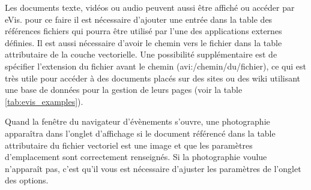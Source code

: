 \label{evis_location}

Les documents texte, vidéos ou audio peuvent aussi être affiché ou accéder par eVis. pour ce faire il est nécessaire d'ajouter une entrée dans la table des références fichiers qui pourra être utilisé par l'une des applications externes définies. Il est aussi nécessaire d'avoir le chemin vers le fichier dans la table attributaire de la couche vectorielle. Une possibilité supplémentaire est de spécifier l'extension du fichier avant le chemin (avi:/chemin/du/fichier), ce qui est très utile pour accéder à des documents placés sur des sites ou des wiki utilisant une base de données pour la gestion de leurs pages (voir la table \ref{tab:evis_examples}).

\label{evis_using_browser}


Quand la fenêtre du navigateur d'évènements s'ouvre, une photographie apparaîtra dans l'onglet d'affichage si le document référencé dans la table attributaire du fichier vectoriel est une image et que les paramètres d'emplacement sont correctement renseignés. Si la photographie voulue n'apparaît pas, c'est qu'il vous est nécessaire d'ajuster les paramètres de l'onglet des options.


